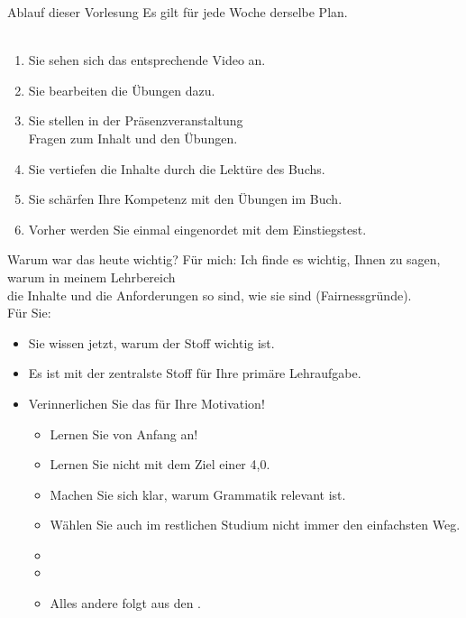 \begin{frame}
  {Ablauf dieser Vorlesung}
  \onslide<+->
  \onslide<+->
  Es gilt für jede Woche derselbe Plan.\\
  \\
  \Zeile
  \begin{enumerate}[<+->]\Large
    \item Sie sehen sich das entsprechende \alert{Video} an.
    \item Sie bearbeiten die \alert{Übungen} dazu.
    \item Sie stellen in der Präsenzveranstaltung\\
      \alert{Fragen zum Inhalt und den Übungen}.
    \item Sie vertiefen die Inhalte durch die \alert{Lektüre des Buchs}.
    \item Sie schärfen Ihre Kompetenz mit den \alert{Übungen im Buch}.
      \Halbzeile
    \item[ ] Vorher werden Sie einmal eingenordet mit dem \alert{Einstiegstest}.
  \end{enumerate}
\end{frame}

\begin{frame}
  {Warum war das heute wichtig?}
  \onslide<+->
  \onslide<+->
  Für mich: Ich finde es wichtig, Ihnen zu sagen, warum in meinem Lehrbereich\\
  die Inhalte und die Anforderungen so sind, wie sie sind (\alert{Fairnessgründe}).\\
  \onslide<+->
  \Zeile
  Für Sie:\\
  \Halbzeile
  \begin{itemize}[<+->]
    \item Sie wissen jetzt, \alert{warum der Stoff wichtig ist}.
    \item Es ist mit der zentralste Stoff für Ihre primäre Lehraufgabe.
    \item \alert{Verinnerlichen Sie das für Ihre Motivation!}
      \begin{itemize}[<+->]
        \item \alert{Lernen Sie von Anfang an!}
        \item Lernen Sie nicht mit dem Ziel einer 4,0.
        \item \alert{Machen Sie sich klar, warum Grammatik relevant ist.}
        \item Wählen Sie auch im restlichen Studium nicht immer den einfachsten Weg.
          \Viertelzeile
        \item {}
          \Viertelzeile
        \item {}
        \item Alles andere folgt aus den .
      \end{itemize}
  \end{itemize}
\end{frame}


